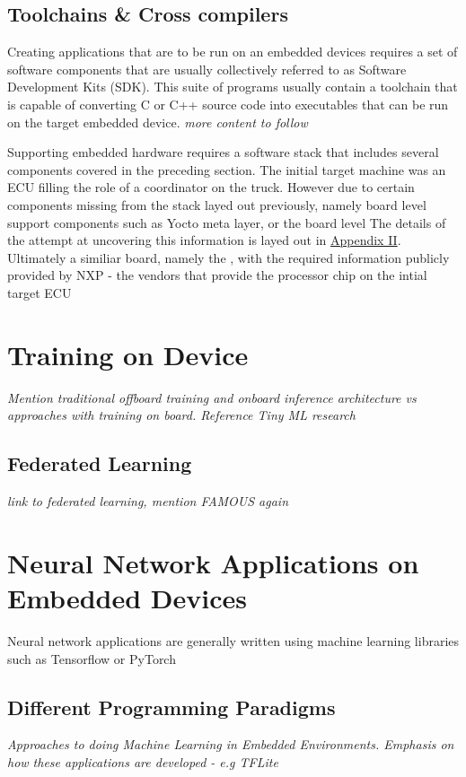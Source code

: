 \subsection[SDKs \& Compiler Toolchains]{Toolchains \& Cross compilers}

Creating applications that are to be run on an embedded devices requires a set of software components that are usually collectively referred to as Software Development Kits (SDK). This suite of programs usually contain a toolchain that is capable of converting C or C++ source code into executables that can be run on the target embedded device. \textit{more content to follow}

Supporting embedded hardware requires a software stack that includes several components covered in the preceding section. The initial target machine was an ECU filling the role of a coordinator on the truck. However due to certain components missing from the stack layed out previously, namely board level support components such as Yocto meta layer, or the board level The details of the attempt at uncovering this information is layed out in \hyperref[rtc-c300]{Appendix II}. Ultimately a similiar board, namely the , with the required information publicly provided by NXP - the vendors that provide the processor chip on the intial target ECU

\section{Training on Device}

\textit{Mention traditional offboard training and onboard inference architecture vs approaches with training on board. Reference Tiny ML research}

\subsection{Federated Learning}

\textit{link to federated learning, mention FAMOUS again}

\section{Neural Network Applications on Embedded Devices}

Neural network applications are generally written using machine learning libraries such as Tensorflow or PyTorch

\subsection{Different Programming Paradigms}
\textit{Approaches to doing Machine Learning in Embedded Environments. Emphasis on how these applications are developed - e.g TFLite}


